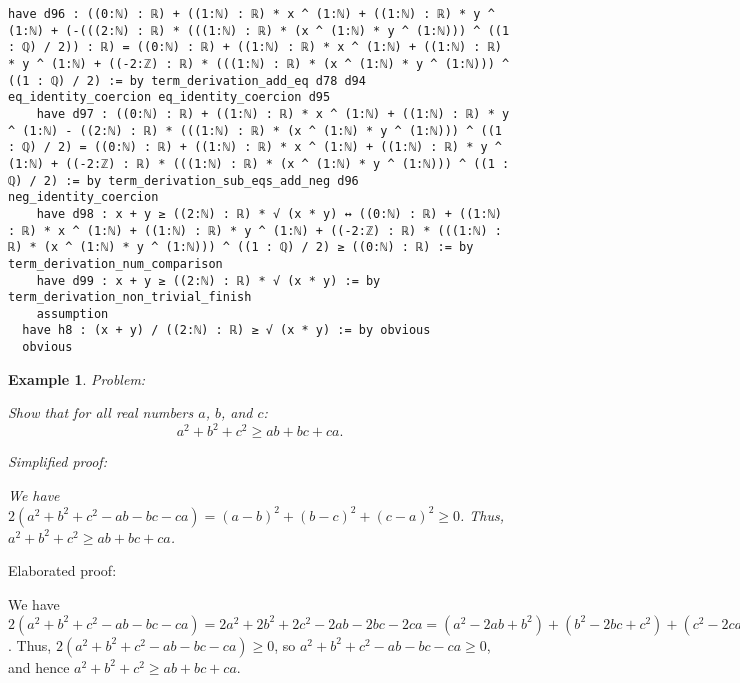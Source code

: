 \documentclass{article}
\newtheorem{example}{Example}
\begin{document}
\begin{tcolorbox}[colback=white!10, width=\linewidth]
\begin{lstlisting}[language=Lean4]
    have d96 : ((0:ℕ) : ℝ) + ((1:ℕ) : ℝ) * x ^ (1:ℕ) + ((1:ℕ) : ℝ) * y ^ (1:ℕ) + (-(((2:ℕ) : ℝ) * (((1:ℕ) : ℝ) * (x ^ (1:ℕ) * y ^ (1:ℕ))) ^ ((1 : ℚ) / 2)) : ℝ) = ((0:ℕ) : ℝ) + ((1:ℕ) : ℝ) * x ^ (1:ℕ) + ((1:ℕ) : ℝ) * y ^ (1:ℕ) + ((-2:ℤ) : ℝ) * (((1:ℕ) : ℝ) * (x ^ (1:ℕ) * y ^ (1:ℕ))) ^ ((1 : ℚ) / 2) := by term_derivation_add_eq d78 d94 eq_identity_coercion eq_identity_coercion d95
    have d97 : ((0:ℕ) : ℝ) + ((1:ℕ) : ℝ) * x ^ (1:ℕ) + ((1:ℕ) : ℝ) * y ^ (1:ℕ) - ((2:ℕ) : ℝ) * (((1:ℕ) : ℝ) * (x ^ (1:ℕ) * y ^ (1:ℕ))) ^ ((1 : ℚ) / 2) = ((0:ℕ) : ℝ) + ((1:ℕ) : ℝ) * x ^ (1:ℕ) + ((1:ℕ) : ℝ) * y ^ (1:ℕ) + ((-2:ℤ) : ℝ) * (((1:ℕ) : ℝ) * (x ^ (1:ℕ) * y ^ (1:ℕ))) ^ ((1 : ℚ) / 2) := by term_derivation_sub_eqs_add_neg d96 neg_identity_coercion
    have d98 : x + y ≥ ((2:ℕ) : ℝ) * √ (x * y) ↔ ((0:ℕ) : ℝ) + ((1:ℕ) : ℝ) * x ^ (1:ℕ) + ((1:ℕ) : ℝ) * y ^ (1:ℕ) + ((-2:ℤ) : ℝ) * (((1:ℕ) : ℝ) * (x ^ (1:ℕ) * y ^ (1:ℕ))) ^ ((1 : ℚ) / 2) ≥ ((0:ℕ) : ℝ) := by term_derivation_num_comparison
    have d99 : x + y ≥ ((2:ℕ) : ℝ) * √ (x * y) := by term_derivation_non_trivial_finish
    assumption
  have h8 : (x + y) / ((2:ℕ) : ℝ) ≥ √ (x * y) := by obvious
  obvious

\end{lstlisting}
\end{tcolorbox}


\begin{example}
Problem:
\begin{tcolorbox}[colback=yellow!10, width=\linewidth]
Show that for all real numbers $a$, $b$, and $c$:
    $$a^2 + b^2 + c^2 \geq ab + bc + ca.$$
\end{tcolorbox}

Simplified proof:
\begin{tcolorbox}[colback=blue!10, width=\linewidth]
We have $2(a^2 + b^2 + c^2 - ab - bc - ca) = (a-b)^2 + (b-c)^2 + (c-a)^2 \ge 0$. Thus, $a^2 + b^2 + c^2 \geq ab + bc + ca$.
\end{tcolorbox}
\end{example}

Elaborated proof:
\begin{tcolorbox}[colback=green!10, width=\linewidth]
We have $2(a^2 + b^2 + c^2 - ab - bc - ca) = 2a^2 + 2b^2 + 2c^2 - 2ab - 2bc - 2ca = (a^2 - 2ab + b^2) + (b^2 - 2bc + c^2) + (c^2 - 2ca + a^2) = (a-b)^2 + (b-c)^2 + (c-a)^2 \ge 0$. Thus, $2(a^2 + b^2 + c^2 - ab - bc - ca) \ge 0$, so $a^2 + b^2 + c^2 - ab - bc - ca \ge 0$, and hence $a^2 + b^2 + c^2 \geq ab + bc + ca$.
\end{tcolorbox}
\end{document}
